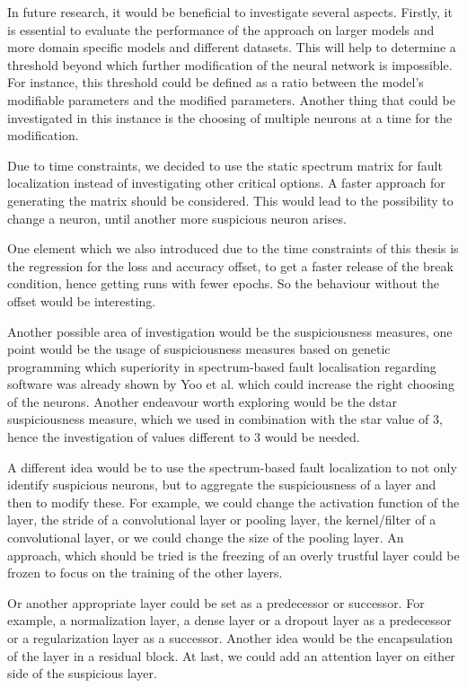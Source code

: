In future research, it would be beneficial to investigate several aspects.
Firstly, it is essential to evaluate the performance of the approach on larger models and more domain specific models and different datasets.
This will help to determine a threshold beyond which further modification of the neural network is impossible.
For instance, this threshold could be defined as a ratio between the model's modifiable parameters and the modified parameters.
Another thing that could be investigated in this instance is the choosing of multiple neurons at a time for the modification.

Due to time constraints, we decided to use the static spectrum matrix for fault localization instead of investigating other critical options.
A faster approach for generating the matrix should be considered.
This would lead to the possibility to change a neuron, until another more suspicious neuron arises.

One element which we also introduced due to the time constraints of this thesis is the regression for the loss and accuracy offset, to get a faster release of the break condition, hence getting runs with fewer epochs.
So the behaviour without the offset would be interesting.

Another possible area of investigation would be the suspiciousness measures, one point would be the usage of suspiciousness measures based on genetic programming which superiority in spectrum-based fault localisation regarding software was already shown by Yoo et al. \cite{yoo_human_2017} which could increase the right choosing of the neurons.
Another endeavour worth exploring would be the dstar suspiciousness measure, which we used in combination with the star value of 3, hence the investigation of values different to 3 would be needed.

A different idea would be to use the spectrum-based fault localization to not only identify suspicious neurons, but to aggregate the suspiciousness of a layer and then to modify these.
For example, we could change the activation function of the layer, the stride of a convolutional layer or pooling layer, the kernel/filter of a convolutional layer, or we could change the size of the pooling layer.
An approach, which should be tried is the freezing of an overly trustful layer could be frozen to focus on the training of the other layers.

Or another appropriate layer could be set as a predecessor or successor.
For example, a normalization layer, a dense layer or a dropout layer as a predecessor or a regularization layer as a successor.
Another idea would be the encapsulation of the layer in a residual block.
At last, we could add an attention layer on either side of the suspicious layer.


